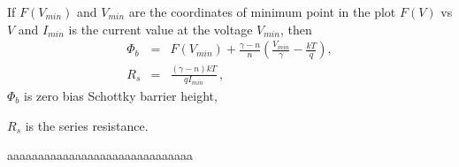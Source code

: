 \documentclass[14pt]{article}
\numberwithin{equation}{part}
\begin{document}
If $F(V_{min})$ and $V_{min}$ are the coordinates of minimum point in the plot $F(V)$ vs $V$ and
$I_{min}$ is the current value at the voltage $V_{min}$, then
\begin{eqnarray*}
\Phi_b&=&F(V_{min})+\frac{\gamma-n}{n}\left(\frac{V_{min}}{\gamma}-\frac{kT}{q}\right),
\\
R_s&=&\frac{(\gamma-n)kT}{qI_{min}}\,,
\end{eqnarray*}
$\Phi_b$ is zero bias Schottky barrier height,

\noindent
$R_s$ is the series resistance.


\vspace{5mm}
aaaaaaaaaaaaaaaaaaaaaaaaaaaaaa
\vspace{5mm}
\end{document}
